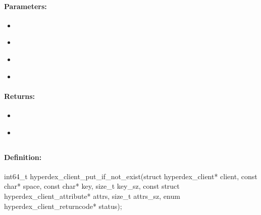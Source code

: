 \paragraph{Parameters:}
\begin{itemize}[noitemsep]
\item {}\\

\item {}\\

\item {}\\

\item {}\\

\end{itemize}

\paragraph{Returns:}
\begin{itemize}[noitemsep]
\item {}\\

\item {}\\

\end{itemize}

\pagebreak
\subsection{}
\label{api:c:put_if_not_exist}


\paragraph{Definition:}
\begin{ccode}
int64_t hyperdex_client_put_if_not_exist(struct hyperdex_client* client,
        const char* space,
        const char* key, size_t key_sz,
        const struct hyperdex_client_attribute* attrs, size_t attrs_sz,
        enum hyperdex_client_returncode* status);
\end{ccode}

